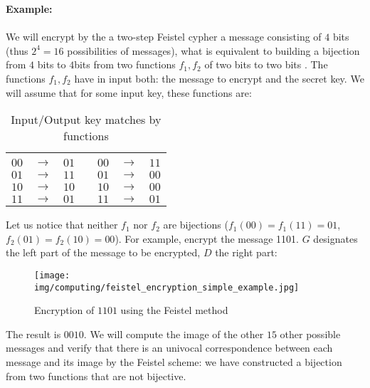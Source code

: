 	\begin{tcolorbox}[colframe=black,colback=white,sharp corners]
	\textbf{{\Large {}}Example:}\\\\
	We will encrypt by the a two-step Feistel cypher a message consisting of $4$ bits (thus $2^4=16$ possibilities of messages), what is equivalent to building a bijection from $4$ bits to $4$bits from two functions $f_1,f_2$ of two bits to two bits . The functions $f_1,f_2$ have in input both: the message to encrypt and the secret key. We will assume that for some input key, these functions are:
	\begin{table}[H]
	\centering
		\begin{tabular}{|c|c|c|l|c|c|c|}
		\cline{1-3} \cline{5-7}
		\multicolumn{1}{|l|}{\cellcolor[HTML]{9B9B9B}{\color[HTML]{333333} \textbf{Input}}} & \multicolumn{1}{l|}{\cellcolor[HTML]{9B9B9B}{\color[HTML]{333333} \textbf{$f_1$}}} & \multicolumn{1}{l|}{\cellcolor[HTML]{9B9B9B}{\color[HTML]{333333} \textbf{Output}}} &  & \multicolumn{1}{l|}{\cellcolor[HTML]{9B9B9B}{\color[HTML]{333333} \textbf{Input}}} & \multicolumn{1}{l|}{\cellcolor[HTML]{9B9B9B}{\color[HTML]{333333} \textbf{$f_2$}}} & \multicolumn{1}{l|}{\cellcolor[HTML]{9B9B9B}{\color[HTML]{333333} \textbf{Output}}} \\ \cline{1-3} \cline{5-7} 
		$00$ & $\rightarrow$ & $01$ &  & $00$ & $\rightarrow$ & $11$ \\ \cline{1-3} \cline{5-7} 
		$01$ & $\rightarrow$ & $11$ &  & $01$ & $\rightarrow$ & $00$ \\ \cline{1-3} \cline{5-7} 
		$10$ & $\rightarrow$ & $10$ &  & $10$ & $\rightarrow$ & $00$ \\ \cline{1-3} \cline{5-7} 
		$11$ & $\rightarrow$ & $01$ &  & $11$ & $\rightarrow$ & $01$ \\ \cline{1-3} \cline{5-7} 
		\end{tabular}
		\caption{Input/Output key matches by functions}
	\end{table}
	Let us notice that neither $f_1$ nor $f_2$ are bijections ($f_1(00)=f_1(11)=01$,$f_2(01)=f_2(10)=00$). For example, encrypt the message 1101. $G$ designates the left part of the message to be encrypted, $D$ the right part:
	\begin{figure}[H]
		\centering
		\texttt{[image: img/computing/feistel\_encryption\_simple\_example.jpg]}
		\caption{Encryption of $1101$ using the Feistel method}
	\end{figure}
	The result is $0010$. We will compute the image of the other $15$ other possible messages and verify that there is an univocal correspondence between each message and its image by the Feistel scheme: we have constructed a bijection from two functions that are not bijective.
	\end{tcolorbox}

